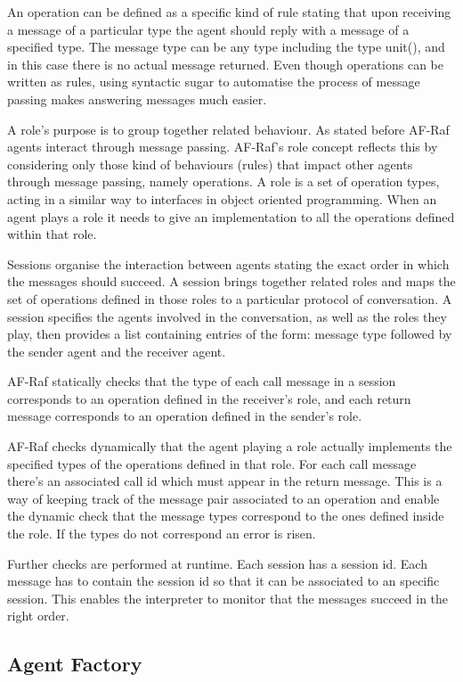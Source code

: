 \documentclass[a4paper,12pt,oneside,fleqn]{book} %
\begin{document}
An operation can be defined as a specific kind of rule stating that upon
receiving a message of a particular type the agent should reply with a
message of a specified type. The message type can be any type including the
type unit(), and in this case there is no actual message returned. Even
though operations can be written as rules, using syntactic sugar to
automatise the process of message passing makes answering messages much
easier.

A role's purpose is to group together related behaviour. As stated before
AF-Raf agents interact through message passing. AF-Raf's role concept
reflects this by considering only those kind of behaviours (rules) that
impact other agents through message passing, namely operations. A role is a
set of operation types, acting in a similar way to interfaces in object
oriented programming. When an agent plays a role it needs to give an
implementation to all the operations defined within that role.

Sessions organise the interaction between agents stating the exact order in
which the messages should succeed. A session brings together related roles
and maps the set of operations defined in those roles to a particular
protocol of conversation. A session specifies the agents involved in the
conversation, as well as the roles they play, then provides a list
containing entries of the form: message type followed by the sender agent
and the receiver agent.

AF-Raf statically checks that the type of each call message in a session
corresponds to an operation defined in the receiver's role, and each return
message corresponds to an operation defined in the sender's role.

AF-Raf checks dynamically that the agent playing a role actually implements
the specified types of the operations defined in that role.  For each call
message there's an associated call id which must appear in the return
message. This is a way of keeping track of the message pair associated to
an operation and enable the dynamic check that the message types correspond
to the ones defined inside the role. If the types do not correspond an
error is risen.

Further checks are performed at runtime. Each session has a session id.
Each message has to contain the session id so that it can be associated to
an specific session. This enables the interpreter to monitor that the
messages succeed in the right order.

\subsection{Agent Factory} %
\end{document}
